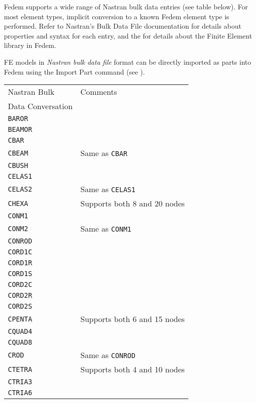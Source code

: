 \clearpage



Fedem supports a wide range of Nastran bulk data entries (see table below).
For most element types, implicit conversion to a known Fedem element type is
performed. Refer to Nastran's Bulk Data File documentation for details about
properties and syntax for each entry, and the
for details about the Finite Element library in Fedem.

FE models in {\sl Nastran bulk data file} format can be
directly imported as parts into Fedem using the Import Part command
(see ).


\begin{tabular}{| m{} |  m{} |}
  \hline
  \rowcolor[HTML]{EFEFEF} Nastran Bulk      & Comments \\
  \rowcolor[HTML]{EFEFEF} Data Conversation &          \\
  \hline\hline
  {\tt BAROR}  & \\\hline
  {\tt BEAMOR} & \\\hline
  {\tt CBAR}   & \\\hline
  {\tt CBEAM}  & Same as {\tt CBAR} \\\hline
  {\tt CBUSH}  & \\\hline
  {\tt CELAS1} & \\\hline
  {\tt CELAS2} & Same as {\tt CELAS1} \\\hline
  {\tt CHEXA}  & Supports both 8 and 20 nodes \\\hline
  {\tt CONM1}  & \\\hline
  {\tt CONM2}  & Same as {\tt CONM1} \\\hline
  {\tt CONROD} & \\\hline
  {\tt CORD1C} & \\\hline
  {\tt CORD1R} & \\\hline
  {\tt CORD1S} & \\\hline
  {\tt CORD2C} & \\\hline
  {\tt CORD2R} & \\\hline
  {\tt CORD2S} & \\\hline
  {\tt CPENTA} & Supports both 6 and 15 nodes \\\hline
  {\tt CQUAD4} & \\\hline
  {\tt CQUAD8} & \\\hline
  {\tt CROD}   & Same as {\tt CONROD} \\\hline
  {\tt CTETRA} & Supports both 4 and 10 nodes \\\hline
  {\tt CTRIA3} & \\\hline
  {\tt CTRIA6} & \\\hline
\end{tabular}

